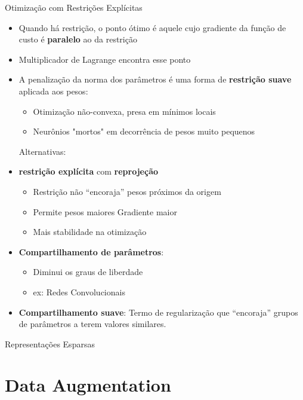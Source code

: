 \documentclass{beamer}
\begin{document}
\begin{frame}{Otimização com Restrições Explícitas}
\begin{itemize}
  \item Quando há restrição, o ponto ótimo é aquele cujo gradiente da função de custo é \textbf{paralelo} ao da restrição
  \item Multiplicador de Lagrange encontra esse ponto
  \item A penalização da norma dos parâmetros é uma forma de \textbf{restrição suave} aplicada aos pesos:
    \begin{itemize}
      \item Otimização não-convexa, presa em mínimos locais
      \item Neurônios "mortos" em decorrência de pesos muito pequenos
    \end{itemize}
  Alternativas:
  \item \textbf{restrição explícita} com \textbf{reprojeção}
    \begin{itemize}
      \item Restrição não ``encoraja'' pesos próximos da origem
      \item Permite pesos maiores \textrightarrow Gradiente maior \textrightarrow 
      \item Mais stabilidade na otimização
    \end{itemize}
  \item \textbf{Compartilhamento de parâmetros}: 
    \begin{itemize}
      \item Diminui os graus de liberdade
        \item ex: Redes Convolucionais
    \end{itemize}
  \item \textbf{Compartilhamento suave}: Termo de regularização que ``encoraja'' grupos de parâmetros a terem valores similares.

  \end{itemize}
\end{frame}


\begin{frame}{Representações Esparsas}
\end{frame}


\section{Data Augmentation}
\end{document}
